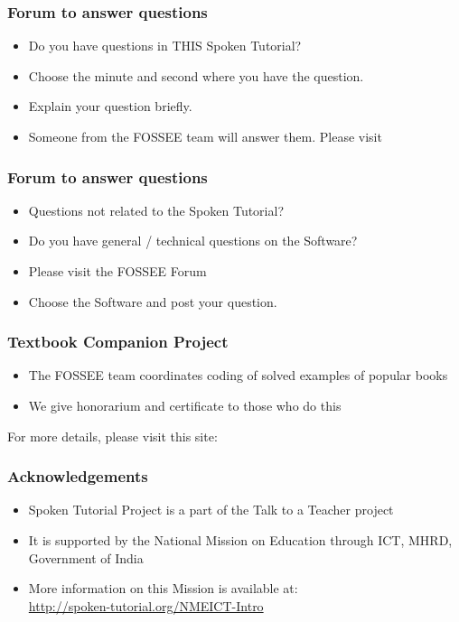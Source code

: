 \documentclass[17pt]{beamer}
\begin{document}
\begin{frame}
\frametitle{Forum to answer questions}
\begin{itemize}
\item Do you have questions in THIS Spoken Tutorial?
\item Choose the minute and second where you have the question.
\item Explain your question briefly.
\item Someone from the FOSSEE team will answer them. Please visit 
\end{itemize}
\begin{center}
{\color{blue}{http://forums.spoken-tutorial.org/}}
 \end{center} 
\end{frame}
\begin{frame}
\frametitle{Forum to answer questions}
\begin{itemize}
\item Questions not related to the Spoken Tutorial?
\item Do you have general / technical questions on the Software?
\item Please visit the FOSSEE Forum
\begin{center}
{\color{blue}{http://forums.fossee.in/}}
 \end{center}
\item Choose the Software and post your question.
\end{itemize}
\end{frame}
\begin{frame}
\frametitle{Textbook Companion Project}
\begin{itemize}
\item The FOSSEE team coordinates coding of solved examples of popular
  books 
\item We give honorarium and certificate to those who do this
\end{itemize}
For more details, please visit this site:
\begin{center}
{\color{blue}{http://tbc-python.fossee.in/}}
\end{center}
\end{frame}
\begin{frame}
\frametitle{Acknowledgements}
\begin{itemize}
\item Spoken Tutorial Project is a part of the Talk to a Teacher  project 
\item It is supported by the National Mission on Education through  ICT, MHRD, Government of India 
\item More information on this Mission is available at: \\{\color{blue}\url{http://spoken-tutorial.org/NMEICT-Intro}}
\end{itemize}
\end{frame}
\end{document}
